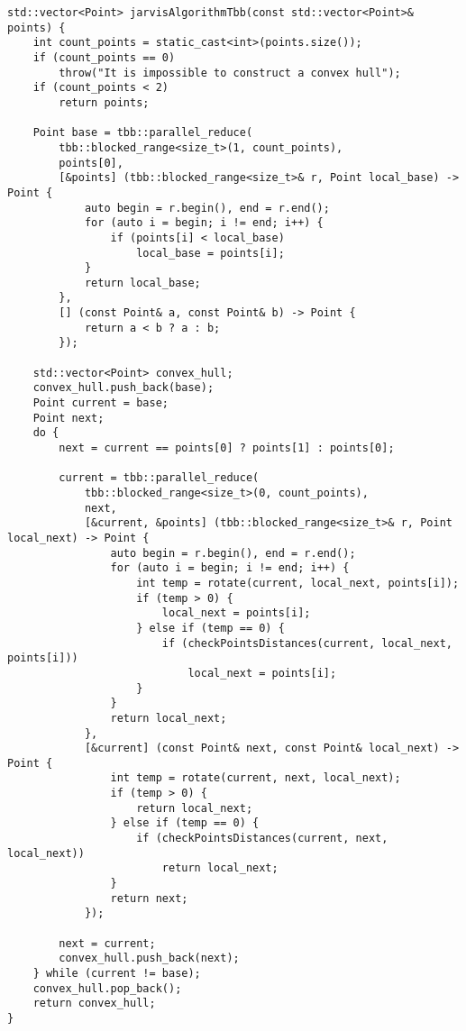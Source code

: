 \documentclass{report}
\begin{document}
\begin{lstlisting}
std::vector<Point> jarvisAlgorithmTbb(const std::vector<Point>& points) {
    int count_points = static_cast<int>(points.size());
    if (count_points == 0)
        throw("It is impossible to construct a convex hull");
    if (count_points < 2)
        return points;

    Point base = tbb::parallel_reduce(
        tbb::blocked_range<size_t>(1, count_points),
        points[0],
        [&points] (tbb::blocked_range<size_t>& r, Point local_base) -> Point {
            auto begin = r.begin(), end = r.end();
            for (auto i = begin; i != end; i++) {
                if (points[i] < local_base)
                    local_base = points[i];
            }
            return local_base;
        },
        [] (const Point& a, const Point& b) -> Point {
            return a < b ? a : b;
        });

    std::vector<Point> convex_hull;
    convex_hull.push_back(base);
    Point current = base;
    Point next;
    do {
        next = current == points[0] ? points[1] : points[0];

        current = tbb::parallel_reduce(
            tbb::blocked_range<size_t>(0, count_points),
            next,
            [&current, &points] (tbb::blocked_range<size_t>& r, Point local_next) -> Point {
                auto begin = r.begin(), end = r.end();
                for (auto i = begin; i != end; i++) {
                    int temp = rotate(current, local_next, points[i]);
                    if (temp > 0) {
                        local_next = points[i];
                    } else if (temp == 0) {
                        if (checkPointsDistances(current, local_next, points[i]))
                            local_next = points[i];
                    }
                }
                return local_next;
            },
            [&current] (const Point& next, const Point& local_next) -> Point {
                int temp = rotate(current, next, local_next);
                if (temp > 0) {
                    return local_next;
                } else if (temp == 0) {
                    if (checkPointsDistances(current, next, local_next))
                        return local_next;
                }
                return next;
            });

        next = current;
        convex_hull.push_back(next);
    } while (current != base);
    convex_hull.pop_back();
    return convex_hull;
}
\end{lstlisting}
\end{document}
